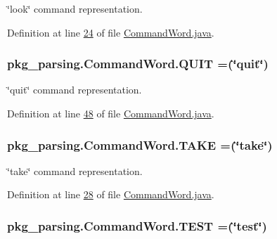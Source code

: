 \char`\"{}look\char`\"{} command representation. 



Definition at line \hyperlink{CommandWord_8java_source_l00024}{24} of file \hyperlink{CommandWord_8java_source}{Command\-Word.\-java}.

\hypertarget{enumpkg__parsing_1_1CommandWord_a2f645cd1791d5576f42e1fe14d202c17}{
\subsubsection[{Q\-U\-I\-T}]{\setlength{\rightskip}{0pt plus 5cm}pkg\-\_\-parsing.\-Command\-Word.\-Q\-U\-I\-T =(\char`\"{}quit\char`\"{})}}\label{enumpkg__parsing_1_1CommandWord_a2f645cd1791d5576f42e1fe14d202c17}


\char`\"{}quit\char`\"{} command representation. 



Definition at line \hyperlink{CommandWord_8java_source_l00048}{48} of file \hyperlink{CommandWord_8java_source}{Command\-Word.\-java}.

\hypertarget{enumpkg__parsing_1_1CommandWord_ae5353500b91f141ae399403b5e87cc28}{
\subsubsection[{T\-A\-K\-E}]{\setlength{\rightskip}{0pt plus 5cm}pkg\-\_\-parsing.\-Command\-Word.\-T\-A\-K\-E =(\char`\"{}take\char`\"{})}}\label{enumpkg__parsing_1_1CommandWord_ae5353500b91f141ae399403b5e87cc28}


\char`\"{}take\char`\"{} command representation. 



Definition at line \hyperlink{CommandWord_8java_source_l00028}{28} of file \hyperlink{CommandWord_8java_source}{Command\-Word.\-java}.

\hypertarget{enumpkg__parsing_1_1CommandWord_acf61cb32b4d651f87b2cd342761f9a79}{
\subsubsection[{T\-E\-S\-T}]{\setlength{\rightskip}{0pt plus 5cm}pkg\-\_\-parsing.\-Command\-Word.\-T\-E\-S\-T =(\char`\"{}test\char`\"{})}}\label{enumpkg__parsing_1_1CommandWord_acf61cb32b4d651f87b2cd342761f9a79}


